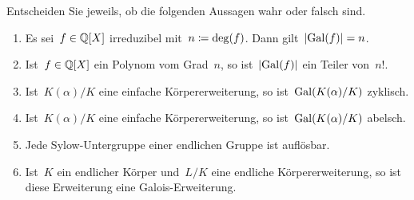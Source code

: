 \documentclass{scrartcl}
\begin{document}
\begin{exercise}[subtitle = {Erstklausur~18/19, Zweitklausur~18/19}]
  Entscheiden Sie jeweils, ob die folgenden Aussagen wahr oder falsch sind.
  \begin{enumerate}
    \item
      Es sei~$f \in \mathbb{Q}[X]$ irreduzibel mit~$n \coloneqq \deg(f)$.
      Dann gilt~$\lvert \operatorname{Gal}(f) \rvert = n$.
    \item
      Ist~$f \in \mathbb{Q}[X]$ ein Polynom vom Grad~$n$, so ist~$\lvert \operatorname{Gal}(f) \rvert$ ein Teiler von~$n!$.
    \item
      Ist~$K(\alpha)/K$ eine einfache Körpererweiterung, so ist~$\operatorname{Gal}( K(\alpha) / K )$ zyklisch.
    \item
      Ist~$K(\alpha)/K$ eine einfache Körpererweiterung, so ist~$\operatorname{Gal}( K(\alpha) / K )$ abelsch.
    \item
      Jede Sylow-Untergruppe einer endlichen Gruppe ist auflösbar.
    \item
      Ist~$K$ ein endlicher Körper und~$L/K$ eine endliche Körpererweiterung, so ist diese Erweiterung eine Galois-Erweiterung.
  \end{enumerate}
\end{exercise}
\end{document}
